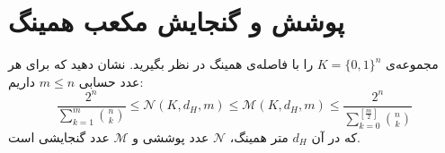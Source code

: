 \section
[مکعب همینگ]
{پوشش و گنجایش مکعب همینگ}
مجموعه‌ی
$K = \{0, 1\}^n$
را با فاصله‌ی همینگ در نظر بگیرید.  نشان دهید که برای هر عدد حسابی
$m \leq n$
داریم:
$$\frac{2^n}{\sum_{k = 1}^{m} {n \choose k}} \leq \mathcal{N}(K, d_H, m) \leq \mathcal{M}(K, d_H, m) \leq \frac{2^n}{\sum_{k = 0}^{[\frac{m}{2}]} {n \choose k}}$$
که در آن $d_H$ متر همینگ، 
$\mathcal{N}$
عدد پوششی و 
$\mathcal{M}$
عدد گنجایشی است.
 